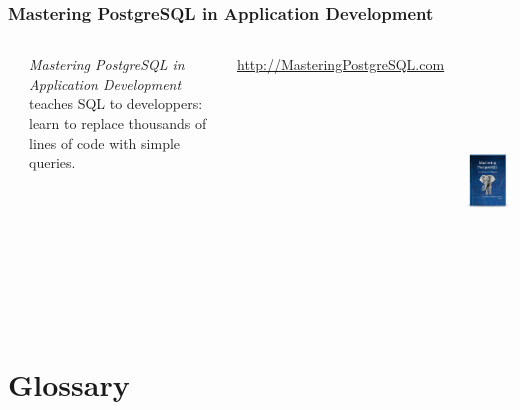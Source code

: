 \documentclass[xcolor=dvipsnames]{beamer}
\begin{document}
\begin{frame}
  \frametitle{Mastering PostgreSQL in Application Development}

  \begin{columns}[c]
    \begin{minipage}[t][12em][t]{\textwidth}
      \begin{center}
        {}
      \end{center}
      
      \vfill
      
      \textit{Mastering PostgreSQL in Application Development} teaches SQL
      to developpers: learn to replace thousands of lines of code with
      simple queries.

      \vfill
      \url{http://MasteringPostgreSQL.com}
    \end{minipage}

    \begin{center}
      \href{http://MasteringPostgreSQL.com}
           {\includegraphics[height=18em]{MasteringPostgreSQLinAppDev-Cover.png}}
    \end{center}
  \end{columns}
\end{frame}

\section{Glossary}
\end{document}
